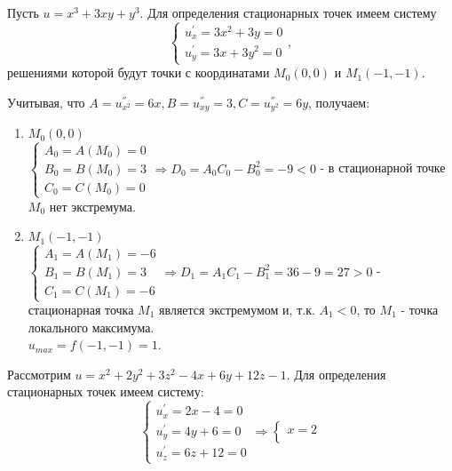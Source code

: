 \begin{examples}
		\item Пусть $u = x^3 + 3xy + y^3$. Для определения стационарных точек имеем систему 
        \begin{equation*}
            \begin{cases}
            u^{'}_x = 3 x^2 + 3y = 0 \\
            u^{'}_y = 3 x + 3 y^2 = 0
            \end{cases},
          \end{equation*}	
          решениями которой будут точки с координатами $M_0 (0,0)$ и $M_1(-1, -1)$.
          
           Учитывая, что $A = u^{''}_{x^2} = 6x, B = u^{''}_{xy} = 3, C = u^{''}_{y^2} = 6y$, получаем:
		\begin{enumerate}
		\item $M_0(0,0)$\\
		$\begin{cases}
		A_0 = A(M_0) = 0 \\
		B_0 = B(M_0) = 3 \\
		C_0 = C(M_0) = 0
		\end{cases} \Rightarrow D_0 = A_0 C_0 - B_0^2 = -9 < 0$ - в стационарной точке $M_0$ нет экстремума.
		\item $M_1(-1,-1)$\\
		$\begin{cases}
		A_1 = A(M_1) = -6 \\
		B_1 = B(M_1) = 3 \\
		C_1 = C(M_1) = -6
		\end{cases} \Rightarrow D_1 = A_1 C_1 - B_1^2 = 36-9 = 27 > 0$ - стационарная точка $M_1$ является экстремумом и, т.к. $A_1 < 0$, то $M_1$ - точка локального максимума.\\
		$u_{max} = f(-1, -1) = 1$.
		\end{enumerate}
		\item Рассмотрим $u = x^2 + 2y^2 + 3z^2 - 4x 	+ 6y + 12z - 1$. Для определения стационарных точек имеем систему: 
        \begin{equation*}
            \begin{cases}
            u^{'}_x = 2x - 4 = 0 \\
            u^{'}_y = 4y + 6 = 0 \\
            u^{'}_z = 6z + 12 = 0
            \end{cases} \Rightarrow \begin{cases}
            x = 2 \\

\end{cases}
\end{equation*}
\end{examples}
